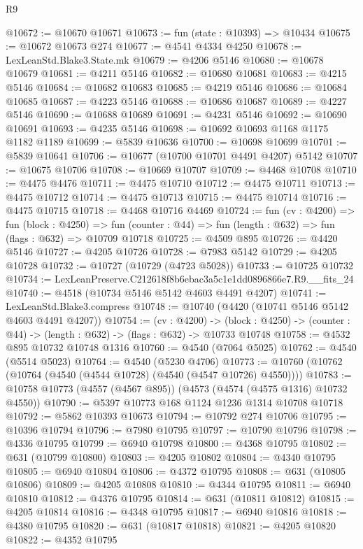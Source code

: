 \begin{lexlean}{R9}
\begin{coremodule}
@10672 := @10670 @10671
@10673 := fun (state : @10393) => @10434
@10675 := @10672 @10673 @274
@10677 := @4541 @4334 @4250
@10678 := LexLeanStd.Blake3.State.mk
@10679 := @4206 @5146
@10680 := @10678 @10679
@10681 := @4211 @5146
@10682 := @10680 @10681
@10683 := @4215 @5146
@10684 := @10682 @10683
@10685 := @4219 @5146
@10686 := @10684 @10685
@10687 := @4223 @5146
@10688 := @10686 @10687
@10689 := @4227 @5146
@10690 := @10688 @10689
@10691 := @4231 @5146
@10692 := @10690 @10691
@10693 := @4235 @5146
@10698 := @10692 @10693 @1168 @1175 @1182 @1189
@10699 := @5839 @10636
@10700 := @10698 @10699
@10701 := @5839 @10641
@10706 := @10677 (@10700 @10701 @4491 @4207) @5142
@10707 := @10675 @10706
@10708 := @10669 @10707
@10709 := @4468 @10708
@10710 := @4475 @4476
@10711 := @4475 @10710
@10712 := @4475 @10711
@10713 := @4475 @10712
@10714 := @4475 @10713
@10715 := @4475 @10714
@10716 := @4475 @10715
@10718 := @4468 @10716 @4469
@10724 := fun (cv : @4200) =>
  fun (block : @4250) =>
  fun (counter : @44) => fun (length : @632) => fun (flags : @632) => @10709 @10718
@10725 := @4509 @895
@10726 := @4420 @5146
@10727 := @4205 @10726
@10728 := @7983 @5142
@10729 := @4205 @10728
@10732 := @10727 (@10729 (@4723 @5028))
@10733 := @10725 @10732
@10734 := LexLeanPreserve.C212618f8b6ebac3a5c1e1dd0896866e7.R9.__fits_24
@10740 := @4518 (@10734 @5146 @5142 @4603 @4491 @4207)
@10741 := LexLeanStd.Blake3.compress
@10748 := @10740 (@4420 (@10741 @5146 @5142 @4603 @4491 @4207))
@10754 := (cv : @4200) ->
  (block : @4250) -> (counter : @44) -> (length : @632) -> (flags : @632) -> @10733 @10748
@10758 := @4532 @895 @10732 @10748 @1316
@10760 := @4540 (@7064 @5025)
@10762 := @4540 (@5514 @5023)
@10764 := @4540 (@5230 @4706)
@10773 := @10760 (@10762 (@10764 (@4540 (@4544 @10728) (@4540 (@4547 @10726) @4550))))
@10783 := @10758 @10773 (@4557 (@4567 @895)) (@4573 (@4574 (@4575 @1316) @10732 @4550))
@10790 := @5397 @10773 @168 @1124 @1236 @1314 @10708 @10718
@10792 := @5862 @10393 @10673
@10794 := @10792 @274 @10706
@10795 := @10396 @10794
@10796 := @7980 @10795
@10797 := @10790 @10796
@10798 := @4336 @10795
@10799 := @6940 @10798
@10800 := @4368 @10795
@10802 := @631 (@10799 @10800)
@10803 := @4205 @10802
@10804 := @4340 @10795
@10805 := @6940 @10804
@10806 := @4372 @10795
@10808 := @631 (@10805 @10806)
@10809 := @4205 @10808
@10810 := @4344 @10795
@10811 := @6940 @10810
@10812 := @4376 @10795
@10814 := @631 (@10811 @10812)
@10815 := @4205 @10814
@10816 := @4348 @10795
@10817 := @6940 @10816
@10818 := @4380 @10795
@10820 := @631 (@10817 @10818)
@10821 := @4205 @10820
@10822 := @4352 @10795

\end{coremodule}
\end{lexlean}
